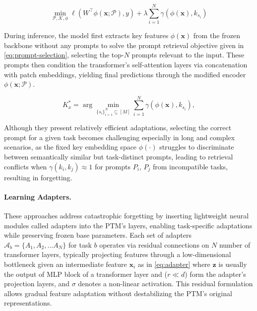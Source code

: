 \begin{equation}
\min_{\mathcal{P}, \mathcal{K}, \phi} \ell(W^\top \phi(\mathbf{x}; \mathcal{P}), y) + \lambda \sum_{i=1}^N \gamma(\phi(\mathbf{x}), k_{s_i})
\label{eq:prompt-training}
\end{equation}

During inference, the model first extracts key features $\phi(\mathbf{x})$ from the frozen backbone without any prompts to solve the prompt retrieval objective given in \cref{eq:prompt-selection}, selecting the top-$N$ prompts relevant to the input. These prompts then condition the transformer's self-attention layers via concatenation with patch embeddings, yielding final predictions through the modified encoder $\phi(\mathbf{x}; \mathcal{P})$.

\begin{equation}
K_x^* = \arg\min_{\{s_i\}_{i=1}^N \subseteq [M]} \sum_{i=1}^N \gamma(\phi(\mathbf{x}), k_{s_i}),
\label{eq:prompt-selection}
\end{equation}

Although they present relatively efficient adaptations, selecting the correct prompt for a given task becomes challenging especially in long and complex scenarios, as the fixed key embedding space $\phi(\cdot)$ struggles to discriminate between semantically similar but task-distinct prompts, leading to retrieval conflicts when $\gamma(k_i, k_j) \approx 1$ for prompts $P_i$, $P_j$ from incompatible tasks, resulting in forgetting.

\paragraph{Learning Adapters.}
These approaches \cite{simplecil_aper, ease, mos} address catastrophic forgetting by inserting lightweight neural modules called adapters into the PTM's layers, enabling task-specific adaptations while preserving frozen base parameters. Each set of adapters $\mathcal{A}_b = \{A_1, A_2, ... A_N\}$ for task $b$ operates via residual connections on $N$ number of transformer layers, typically projecting features through a low-dimensional bottleneck given an intermediate feature $\mathbf{x}_i$ as in \cref{eq:adapter} where $\mathbf{z}$ is usually the output of MLP block of a transformer layer and ($r \ll d$) form the adapter's projection layers, and $\sigma$ denotes a non-linear activation. This residual formulation allows gradual feature adaptation without destabilizing the PTM's original representations.

